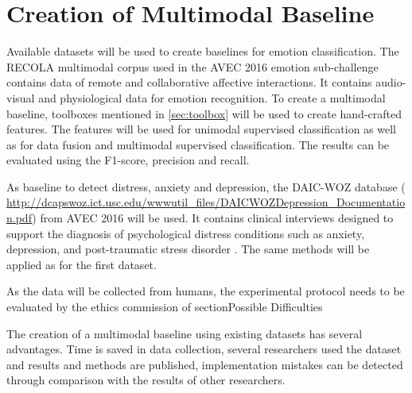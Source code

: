 


\section{Creation of Multimodal Baseline}

Available datasets will be used to create baselines for emotion classification. The RECOLA multimodal corpus used in the AVEC 2016 emotion sub-challenge contains data of remote and collaborative affective interactions. It contains audio-visual and physiological data for emotion recognition. To create a multimodal baseline, toolboxes mentioned in \ref{sec:toolbox} will be used to create hand-crafted features. The features will be used for unimodal supervised classification as well as for data fusion and multimodal supervised classification.  The results can be evaluated using the F1-score, precision and recall.

As baseline to detect distress, anxiety and depression, the DAIC-WOZ database ( \url{http://dcapswoz.ict.usc.edu/wwwutil_files/DAICWOZDepression_Documentation.pdf}) from AVEC 2016 will be used. It contains
clinical interviews designed to support the diagnosis of psychological
distress conditions such as anxiety, depression,
and post-traumatic stress disorder \cite{Valstar2016avec}. The same methods will be applied as for the first dataset.


As the data will be collected from humans, the experimental protocol needs to be evaluated by the ethics commission of section{Possible Difficulties}

The creation of a multimodal baseline using existing datasets has several advantages. Time is saved in data collection, several researchers used the dataset and results and methods are published, implementation mistakes can be detected through comparison with the results of other researchers.



